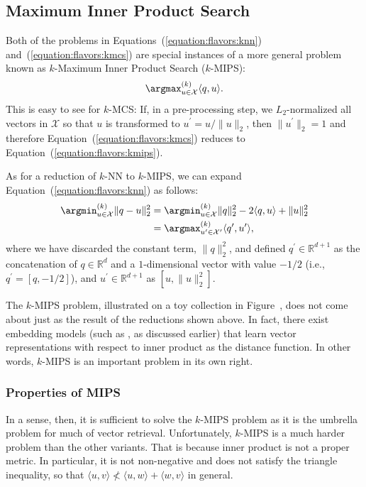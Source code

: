 \subsection{Maximum Inner Product Search}
\label{section:flavors:flavors:mips}
Both of the problems in Equations~(\ref{equation:flavors:knn}) and~(\ref{equation:flavors:kmcs})
are special instances of a more general problem known as $k$-Maximum Inner Product Search ($k$-MIPS):
\begin{equation}
    \label{equation:flavors:kmips}
    \argmax^{(k)}_{u \in \mathcal{X}} \langle q, u \rangle.
\end{equation}
This is easy to see for $k$-MCS: If, in a pre-processing step,
we $L_2$-normalized all vectors in $\mathcal{X}$ so that $u$ is transformed to $u^\prime = u / \lVert u \rVert_2$,
then $\lVert u^\prime \rVert_2 = 1$ and therefore Equation~(\ref{equation:flavors:kmcs}) reduces to Equation~(\ref{equation:flavors:kmips}).

As for a reduction of $k$-NN to $k$-MIPS, we can expand Equation~(\ref{equation:flavors:knn})
as follows:
\begin{align*}
    \argmin^{(k)}_{u \in \mathcal{X}} \lVert q - u \rVert_2^2 &=
        \argmin^{(k)}_{u \in \mathcal{X}} \lVert q \rVert_2^2 - 2\langle q, u \rangle + \lVert u \rVert_2^2\\
    &= \argmax^{(k)}_{u^\prime \in \mathcal{X}^\prime} \langle q^\prime, u^\prime \rangle,
\end{align*}
where we have discarded the constant term, $\lVert q \rVert_2^2$,
and defined $q^\prime \in \mathbb{R}^{d+1}$ as the concatenation of $q \in \mathbb{R}^d$ and
a $1$-dimensional vector with value $-1/2$ (i.e., $q^\prime = [q, -1/2]$),
and $u^\prime \in \mathbb{R}^{d+1}$ as $[u, \lVert u \rVert_2^2]$.

The $k$-MIPS problem, illustrated on a toy collection in
Figure~, does not come about just as the result of the reductions
shown above. In fact, there exist embedding models (such as \splade{}, as discussed earlier)
that learn vector representations with respect to inner product as the distance function.
In other words, $k$-MIPS is an important problem in its own right.

\subsubsection{Properties of MIPS}

In a sense, then, it is sufficient to solve the $k$-MIPS problem
as it is the umbrella problem for much of vector retrieval.
Unfortunately, $k$-MIPS is a much harder problem than the other variants.
That is because inner product is not a proper metric.
In particular, it is not non-negative and does not satisfy the triangle inequality, so that
$\langle u, v \rangle \nless \langle u, w \rangle + \langle w, v \rangle$ in general.


